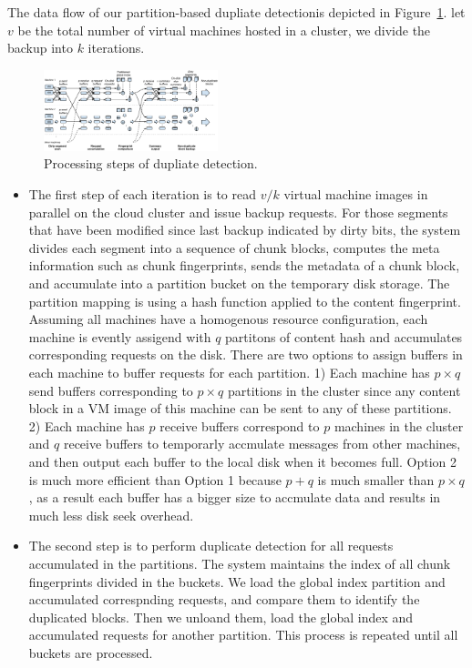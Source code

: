 The data flow of our partition-based  dupliate detectionis depicted in
Figure~\ref{fig:flow}. let $v$ be the total number of virtual machines hosted in  
a cluster,  we divide the backup into $k$  iterations. 
\begin{figure}
\centering
\includegraphics[width=0.45\textwidth]{steps.pdf}
\caption{ Processing steps of dupliate detection.}
\label{fig:flow}
\end{figure}

\begin{itemize}
\item
The first step of each iteration is to read  $v/k$  virtual machine images in parallel on the cloud 
cluster and issue backup requests. For those segments that have been modified since last backup indicated by 
dirty bits,  the system divides  each segment into a sequence of chunk blocks,  computes the meta 
information such as chunk fingerprints,  sends the metadata of a chunk block, and accumulate  into 
a partition bucket on the temporary disk storage. 
The partition mapping is using a hash function applied to the content fingerprint. 
Assuming all machines have a  homogenous resource configuration, each machine is evently  assigend with
$q$ partitons of content hash and accumulates corresponding requests on the disk. 
There are two options to assign buffers in each machine to buffer requests for each partition.
1) Each machine has  $p\times q$ send buffers corresponding to $p\times q$ partitions in the cluster
since any content block in a VM image of this machine can be sent to any of these partitions.
2) Each machine has $p$ receive buffers correspond to $p$ machines in the cluster and $q$ receive 
buffers to temporarly accmulate messages from other machines, and then output each buffer to the local disk
when it becomes full.  Option 2 is much more efficient than Option 1 because $p+q$ is much smaller than
$p\times q$, as a result each buffer has a bigger size to accmulate data and results in 
much less disk seek overhead.

\item
The second step is to perform duplicate detection for  all requests accumulated in the partitions.  
The system maintains the index of all chunk fingerprints divided in the buckets. We load the global index partition 
and accumulated correspnding requests, and compare them to  identify the duplicated blocks.  
Then we unloand them, load the global index and accumulated requests for another partition. 
This process is repeated until all buckets are processed.


\end{itemize}
